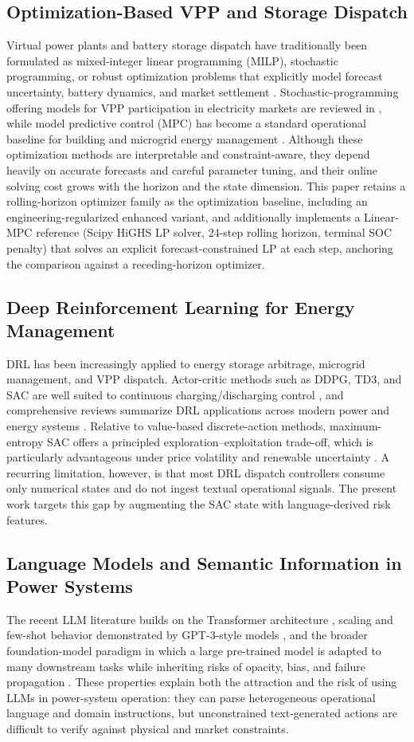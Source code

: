 \documentclass{ieeeaccess}
\begin{document}
\subsection{Optimization-Based VPP and Storage Dispatch}
Virtual power plants and battery storage dispatch have traditionally been formulated as mixed-integer linear programming (MILP), stochastic programming, or robust optimization problems that explicitly model forecast uncertainty, battery dynamics, and market settlement \cite{b10,b13,b14,b15}. Stochastic-programming offering models for VPP participation in electricity markets are reviewed in \cite{b10}, while model predictive control (MPC) has become a standard operational baseline for building and microgrid energy management \cite{b7,b16}. Although these optimization methods are interpretable and constraint-aware, they depend heavily on accurate forecasts and careful parameter tuning, and their online solving cost grows with the horizon and the state dimension. This paper retains a rolling-horizon optimizer family as the optimization baseline, including an engineering-regularized enhanced variant, and additionally implements a Linear-MPC reference (Scipy HiGHS LP solver, 24-step rolling horizon, terminal SOC penalty) that solves an explicit forecast-constrained LP at each step, anchoring the comparison against a receding-horizon optimizer.

\subsection{Deep Reinforcement Learning for Energy Management}
DRL has been increasingly applied to energy storage arbitrage, microgrid management, and VPP dispatch. Actor-critic methods such as DDPG, TD3, and SAC are well suited to continuous charging/discharging control \cite{b3,b11,b12,b17,b18}, and comprehensive reviews summarize DRL applications across modern power and energy systems \cite{b9,b19,b20}. Relative to value-based discrete-action methods, maximum-entropy SAC offers a principled exploration--exploitation trade-off, which is particularly advantageous under price volatility and renewable uncertainty \cite{b3,b11}. A recurring limitation, however, is that most DRL dispatch controllers consume only numerical states and do not ingest textual operational signals. The present work targets this gap by augmenting the SAC state with language-derived risk features.

\subsection{Language Models and Semantic Information in Power Systems}
The recent LLM literature builds on the Transformer architecture \cite{b40}, scaling and few-shot behavior demonstrated by GPT-3-style models \cite{b41}, and the broader foundation-model paradigm in which a large pre-trained model is adapted to many downstream tasks while inheriting risks of opacity, bias, and failure propagation \cite{b42}. These properties explain both the attraction and the risk of using LLMs in power-system operation: they can parse heterogeneous operational language and domain instructions, but unconstrained text-generated actions are difficult to verify against physical and market constraints.
\end{document}

